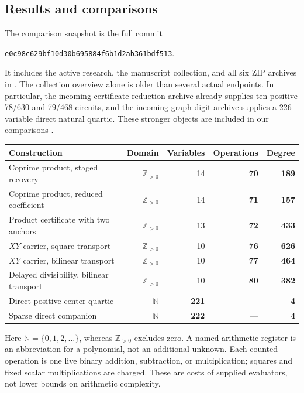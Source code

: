 \documentclass[11pt,letterpaper]{article}
\theoremstyle{remark}\newtheorem{remark}[theorem]{Remark}
\newcommand{\N}{\mathbb N}
\newcommand{\Pos}{\mathbb Z_{>0}}
\newcommand{\file}[1]{\texttt{\small\detokenize{#1}}}
\begin{document}
\subsection{Results and comparisons}

The comparison snapshot is the full commit
\begin{center}\small\texttt{e0c98c629bf10d30b695884f6b1d2ab361bdf513}.\end{center}
It includes the active research, the manuscript collection, and all six ZIP
archives in \file{docs/incoming}. The collection overview alone is older than
several actual endpoints. In particular, the incoming certificate-reduction
archive already supplies ten-positive 78/630 and 79/468 circuits, and the
incoming graph-digit archive supplies a 226-variable direct natural quartic.
These stronger objects are included in our comparisons \cite{repo,incoming}.

\begin{center}\small
\begin{tabular}{@{}lrrrr@{}}
\toprule
Construction & Domain & Variables & Operations & Degree\\
\midrule
Coprime product, staged recovery & $\Pos$ & 14 & \textbf{70} & \textbf{189}\\
Coprime product, reduced coefficient & $\Pos$ & 14 & \textbf{71} & \textbf{157}\\
Product certificate with two anchors & $\Pos$ & 13 & \textbf{72} & \textbf{433}\\
$XY$ carrier, square transport & $\Pos$ & 10 & \textbf{76} & \textbf{626}\\
$XY$ carrier, bilinear transport & $\Pos$ & 10 & \textbf{77} & \textbf{464}\\
Delayed divisibility, bilinear transport & $\Pos$ & 10 & \textbf{80} & \textbf{382}\\
Direct positive-center quartic & $\N$ & \textbf{221} & --- & \textbf{4}\\
Sparse direct companion & $\N$ & \textbf{222} & --- & \textbf{4}\\
\bottomrule
\end{tabular}
\end{center}

Here $\N=\{0,1,2,\ldots\}$, whereas $\Pos$ excludes zero. A named arithmetic
register is an abbreviation for a polynomial, not an additional unknown.
Each counted operation is one live binary addition, subtraction, or
multiplication; squares and fixed scalar multiplications are charged. These
are costs of supplied evaluators, not lower bounds on arithmetic complexity.
\end{document}
